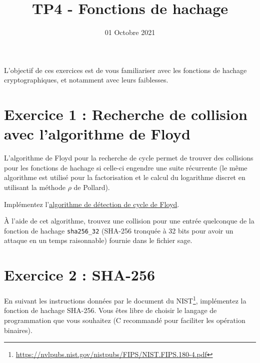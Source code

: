 \documentclass[french,a4paper,11pt]{exam}
\title{\textbf{TP4 - Fonctions de hachage}}
\date{01 Octobre 2021}
\begin{document}
	
	\maketitle
	
	L'objectif de ces exercices est de vous familiariser avec les fonctions de hachage cryptographiques, et notamment avec leurs faiblesses. 
			
	
	\begin{center}
	\end{center}
	
	\section*{Exercice 1 : Recherche de collision avec l'algorithme de Floyd}
	
	L'algorithme de Floyd pour la recherche de cycle permet de trouver des collisions pour les fonctions de hachage si celle-ci engendre une suite récurrente (le même algorithme est utilisé pour la factorisation et le calcul du logarithme discret en utilisant la méthode $\rho$ de Pollard).
	
	\begin{questions}
	
	\question Implémentez l'\href{https://fr.wikipedia.org/wiki/Algorithme\_du\_li%C3%A8vre\_et\_de\_la\_tortue}{algorithme de détection de cycle de Floyd}.

	\question À l'aide de cet algorithme, trouvez une collision pour une entrée quelconque de la fonction de hachage \texttt{sha256\_32} (SHA-256 tronquée à 32 bits pour avoir un attaque en un temps raisonnable) fournie dans le fichier sage.\\
	
	\end{questions}
	
	\section*{Exercice 2 : SHA-256}

	En suivant les instructions données par le document du NIST\footnote{\url{https://nvlpubs.nist.gov/nistpubs/FIPS/NIST.FIPS.180-4.pdf}}, implémentez la fonction de hachage SHA-256. Vous êtes libre de choisir le langage de programmation que vous souhaitez (C recommandé pour faciliter les opération binaires).
\end{document}
